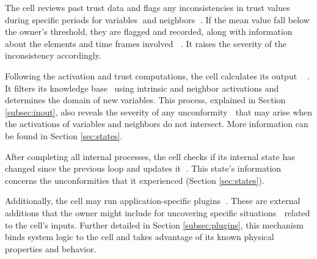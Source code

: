 The cell reviews past trust data and flags any inconsistencies in trust values during specific periods for variables \textcircled{}and neighbors \textcircled{}. If the mean value fall below the owner's threshold, they are flagged and recorded, along with information about the elements and time frames involved \textcircled{}\textcircled{}. It raises the severity of the inconsistency accordingly.

Following the activation and trust computations, the cell calculates its output \textcircled{} \textcircled{}. It filters its knowledge base \ using intrinsic and neighbor activations and determines the domain of new variables. This process, explained in Section \ref{subsec:inout}, also reveals the severity of any unconformity \textcircled{} that may arise when the activations of variables and neighbors do not intersect. More information can be found in Section \ref{sec:states}.

After completing all internal processes, the cell checks if its internal state has changed since the previous loop and updates it \textcircled{}. This state's information \textcircled{} concerns the unconformities that it experienced (Section \ref{sec:states}).

Additionally, the cell may run application-specific plugins \textcircled{}. These are external additions that the owner might include for uncovering specific situations \textcircled{} related to the cell's inputs. Further detailed in Section \ref{subsec:plugins}, this mechanism binds system logic to the cell and takes advantage of its known physical properties and behavior.

